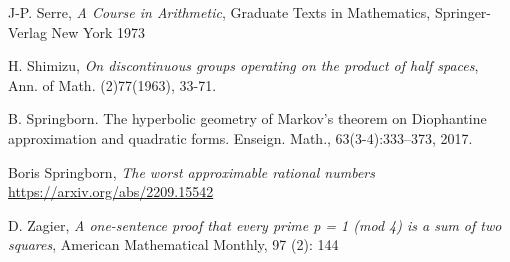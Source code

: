\documentclass[12pt,a4paper]{amsart}
\begin{document}
J-P. Serre,
\textit{A Course in Arithmetic},
Graduate Texts in Mathematics,
Springer-Verlag New York
1973

H. Shimizu, 
\textit{On discontinuous groups operating on the product of half spaces}, Ann. of Math. (2)77(1963), 33-71.



B. Springborn. The hyperbolic geometry of Markov’s theorem on Diophantine
approximation and quadratic forms. Enseign. Math., 63(3-4):333–373, 2017.

Boris Springborn,
\textit{The worst approximable rational numbers}
\url{https://arxiv.org/abs/2209.15542}




D. Zagier,
 \textit{A one-sentence proof that every prime p = 1 (mod 4) is a sum of two squares}, 
 American Mathematical Monthly, 97 (2): 144
 
 
\end{document}
